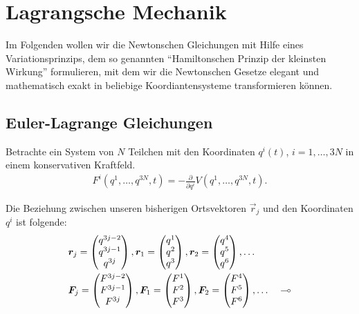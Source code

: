 \section{Lagrangsche Mechanik}
Im Folgenden wollen wir die Newtonschen Gleichungen mit Hilfe eines
Variationsprinzips, dem so genannten ``Hamiltonschen Prinzip der kleinsten
Wirkung'' formulieren, mit dem wir die Newtonschen Gesetze elegant und
mathematisch exakt in beliebige Koordiantensysteme transformieren können.

\subsection{Euler-Lagrange Gleichungen}
Betrachte ein System von $N$ Teilchen mit den Koordinaten $q^i(t)$,
$i=1,\ldots,3N$ in einem konservativen Kraftfeld.
\begin{align*}
F^i(q^1,\ldots,q^{3N},t) = -\frac{\partial}{\partial q^i}V(q^1,\ldots,q^{3N},t).
\end{align*}

\begin{bemn}
Die Beziehung zwischen unseren bisherigen Ortsvektoren $\vec{r}_j$ und den
Koordinaten $q^i$ ist folgende:
\begin{align*}
&\bm{r}_j = \begin{pmatrix}
q^{3j-2}\\q^{3j-1}\\q^{3j}
\end{pmatrix},
\bm{r}_1 = \begin{pmatrix}
q^{1}\\q^{2}\\q^{3}
\end{pmatrix},
\bm{r}_2 = \begin{pmatrix}
q^{4}\\q^{5}\\q^{6}
\end{pmatrix},
\ldots\\
&\bm{F}_j =
\begin{pmatrix}
F^{3j-2}\\F^{3j-1}\\F^{3j}
\end{pmatrix},
\bm{F}_1 = \begin{pmatrix}
F^{1}\\F^{2}\\F^{3}
\end{pmatrix},
\bm{F}_2 = \begin{pmatrix}
F^{4}\\F^{5}\\F^{6}
\end{pmatrix},
\ldots\quad\multimap
\end{align*}
\end{bemn}

